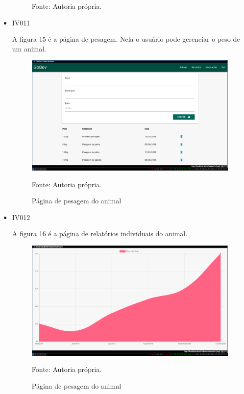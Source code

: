 \begin{itemize}
\begin{figure}[]
\begin{center}
		Fonte: Autoria própria.
	\end{center}
\end{figure}

\newpage
\item IV011

A figura 15 é a página de pesagem. Nela o usuário pode gerenciar o peso de um animal.
\begin{figure}[H]
	\begin{center}
		\caption{Página de pesagem do animal}
		\includegraphics[width=\textwidth]{../img/prototipos/addPeso.png}

		Fonte: Autoria própria.
	\end{center}
\end{figure}

\item IV012

A figura 16 é a página de relatórios individuais do animal.
\begin{figure}[H]
	\begin{center}
		\caption{Página de pesagem do animal}
		\includegraphics[width=\textwidth]{../img/prototipos/relatorio.png}

		Fonte: Autoria própria.
	\end{center}
\end{figure}

\end{itemize}

